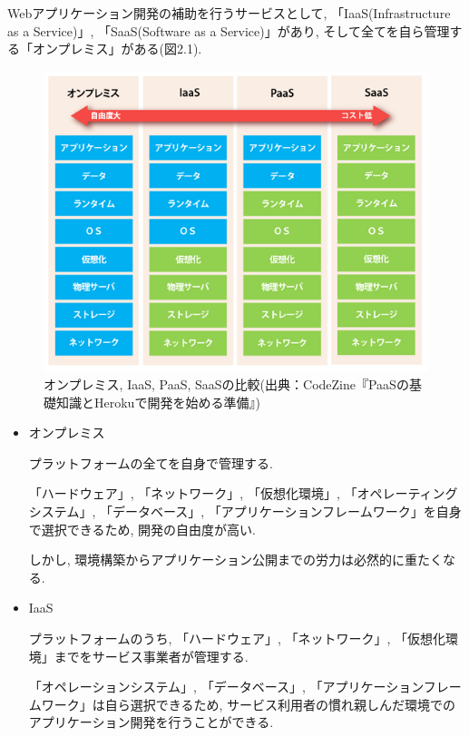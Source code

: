 \begin{description}
Webアプリケーション開発の補助を行うサービスとして, 「IaaS(Infrastructure as a Service)」, 「SaaS(Software as a Service)」があり, そして全てを自ら管理する「オンプレミス」がある(図2.1).

\begin{figure}
\begin{center}
\includegraphics[width=16cm]{fig/paas.png}
\caption{オンプレミス, IaaS, PaaS, SaaSの比較(出典：CodeZine『PaaSの基礎知識とHerokuで開発を始める準備』)}
\end{center}
\end{figure}

\begin{itemize}
\item オンプレミス

プラットフォームの全てを自身で管理する.

「ハードウェア」, 「ネットワーク」, 「仮想化環境」, 「オペレーティングシステム」, 「データベース」, 「アプリケーションフレームワーク」を自身で選択できるため, 開発の自由度が高い.

しかし, 環境構築からアプリケーション公開までの労力は必然的に重たくなる.

\item IaaS

プラットフォームのうち, 「ハードウェア」, 「ネットワーク」, 「仮想化環境」までをサービス事業者が管理する.

「オペレーションシステム」, 「データベース」, 「アプリケーションフレームワーク」は自ら選択できるため, サービス利用者の慣れ親しんだ環境でのアプリケーション開発を行うことができる.


\end{itemize}
\end{description}

